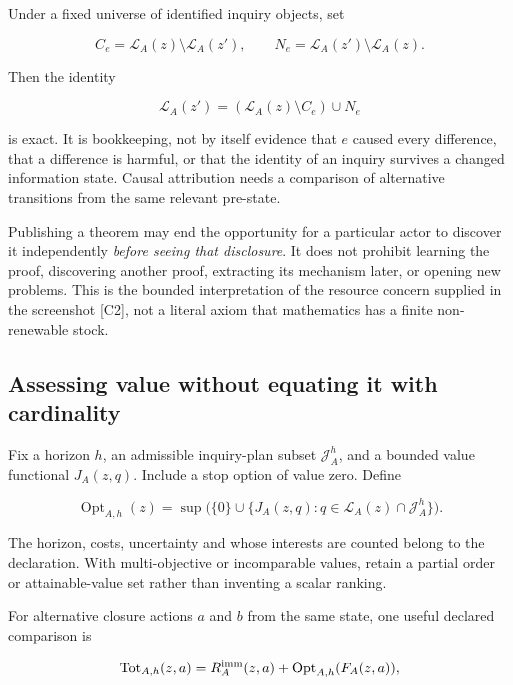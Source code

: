 \documentclass[11pt,a4paper]{article}
\begin{document}
Under a fixed universe of identified inquiry objects, set

\nopagebreak[4]

\[
C_e=\mathcal L_A(z)\setminus\mathcal L_A(z'),\qquad
N_e=\mathcal L_A(z')\setminus\mathcal L_A(z).
\]

Then the identity

\nopagebreak[4]

\[\mathcal L_A(z')=(\mathcal L_A(z)\setminus C_e)\cup N_e\]

is exact. It is bookkeeping, not by itself evidence that \(e\) caused
every difference, that a difference is harmful, or that the identity of
an inquiry survives a changed information state. Causal attribution
needs a comparison of alternative transitions from the same relevant
pre-state.

Publishing a theorem may end the opportunity for a particular actor to
discover it independently \emph{before seeing that disclosure}. It does
not prohibit learning the proof, discovering another proof, extracting
its mechanism later, or opening new problems. This is the bounded
interpretation of the resource concern supplied in the screenshot
{[}C2{]}, not a literal axiom that mathematics has a finite
non-renewable stock.

\subsection{Assessing value without equating it with
cardinality}\label{assessing-value-without-equating-it-with-cardinality}

Fix a horizon \(h\), an admissible inquiry-plan subset
\(\mathscr J_A^h\), and a bounded value functional \(J_A(z,q)\). Include
a stop option of value zero. Define

\nopagebreak[4]

\[
\operatorname{Opt}_{A,h}(z)
=\sup\bigl(\{0\}\cup
\{J_A(z,q):q\in\mathcal L_A(z)\cap\mathscr J_A^h\}\bigr).
\]

The horizon, costs, uncertainty and whose interests are counted belong
to the declaration. With multi-objective or incomparable values, retain
a partial order or attainable-value set rather than inventing a scalar
ranking.

For alternative closure actions \(a\) and \(b\) from the same state, one
useful declared comparison is

\nopagebreak[4]

\[
\operatorname{Tot}_{A,h}(z,a)
=R_A^{\rm imm}(z,a)+\operatorname{Opt}_{A,h}(F_A(z,a)),
\]
\end{document}
